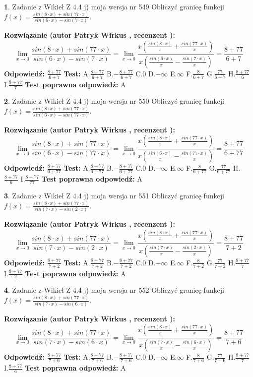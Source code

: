 \documentclass[12pt, a4paper]{article}
\theoremstyle{definition} %
\newtheorem{zad}{}
\newcommand{\zadStart}[1]{\begin{zad}#1\newline}
\newcommand{\zadStop}{\end{zad}}
\newcommand{\rozwStart}[2]{\noindent \textbf{Rozwiązanie (autor #1 , recenzent #2): }\newline}
\newcommand{\rozwStop}{\newline}
\newcommand{\odpStart}{\noindent \textbf{Odpowiedź:}\newline}
\newcommand{\odpStop}{\newline}
\newcommand{\testStart}{\noindent \textbf{Test:}\newline}
\newcommand{\testStop}{\newline}
\newcommand{\kluczStart}{\noindent \textbf{Test poprawna odpowiedź:}\newline}
\newcommand{\kluczStop}{\newline}
\begin{document}
\zadStart{Zadanie z Wikieł Z 4.4 j) moja wersja nr 549}
Obliczyć granicę funkcji $f(x)=\frac{sin(8\cdot x) +sin(77\cdot x)}{sin(6\cdot x) -sin(7\cdot x)}$.
\zadStop
\rozwStart{Patryk Wirkus}{}
$$\lim\limits_{x\to 0}\frac{sin(8\cdot x) +sin(77\cdot x)}{sin(6\cdot x) -sin(7\cdot x)}=\lim\limits_{x\to 0}\frac{x(\frac{sin(8\cdot x)}{x}+\frac{sin(77\cdot x)}{x})}{x(\frac{sin(6\cdot x)}{x}-\frac{sin(7\cdot x)}{x})}=\frac{8+77}{6+7}$$
\rozwStop
\odpStart
$\frac{8+77}{6+7}$
\odpStop
\testStart
A.$\frac{8+77}{6+7}$
B.$-\frac{8+77}{6+7}$
C.$0$
D.$-\infty$
E.$\infty$
F.$\frac{8}{6+7}$
G.$\frac{77}{6+7}$
H.$\frac{8+77}{6}$
I.$\frac{8+77}{7}$
\testStop
\kluczStart
A
\kluczStop



\zadStart{Zadanie z Wikieł Z 4.4 j) moja wersja nr 550}
Obliczyć granicę funkcji $f(x)=\frac{sin(8\cdot x) +sin(77\cdot x)}{sin(6\cdot x) -sin(77\cdot x)}$.
\zadStop
\rozwStart{Patryk Wirkus}{}
$$\lim\limits_{x\to 0}\frac{sin(8\cdot x) +sin(77\cdot x)}{sin(6\cdot x) -sin(77\cdot x)}=\lim\limits_{x\to 0}\frac{x(\frac{sin(8\cdot x)}{x}+\frac{sin(77\cdot x)}{x})}{x(\frac{sin(6\cdot x)}{x}-\frac{sin(77\cdot x)}{x})}=\frac{8+77}{6+77}$$
\rozwStop
\odpStart
$\frac{8+77}{6+77}$
\odpStop
\testStart
A.$\frac{8+77}{6+77}$
B.$-\frac{8+77}{6+77}$
C.$0$
D.$-\infty$
E.$\infty$
F.$\frac{8}{6+77}$
G.$\frac{77}{6+77}$
H.$\frac{8+77}{6}$
I.$\frac{8+77}{77}$
\testStop
\kluczStart
A
\kluczStop



\zadStart{Zadanie z Wikieł Z 4.4 j) moja wersja nr 551}
Obliczyć granicę funkcji $f(x)=\frac{sin(8\cdot x) +sin(77\cdot x)}{sin(7\cdot x) -sin(2\cdot x)}$.
\zadStop
\rozwStart{Patryk Wirkus}{}
$$\lim\limits_{x\to 0}\frac{sin(8\cdot x) +sin(77\cdot x)}{sin(7\cdot x) -sin(2\cdot x)}=\lim\limits_{x\to 0}\frac{x(\frac{sin(8\cdot x)}{x}+\frac{sin(77\cdot x)}{x})}{x(\frac{sin(7\cdot x)}{x}-\frac{sin(2\cdot x)}{x})}=\frac{8+77}{7+2}$$
\rozwStop
\odpStart
$\frac{8+77}{7+2}$
\odpStop
\testStart
A.$\frac{8+77}{7+2}$
B.$-\frac{8+77}{7+2}$
C.$0$
D.$-\infty$
E.$\infty$
F.$\frac{8}{7+2}$
G.$\frac{77}{7+2}$
H.$\frac{8+77}{7}$
I.$\frac{8+77}{2}$
\testStop
\kluczStart
A
\kluczStop



\zadStart{Zadanie z Wikieł Z 4.4 j) moja wersja nr 552}
Obliczyć granicę funkcji $f(x)=\frac{sin(8\cdot x) +sin(77\cdot x)}{sin(7\cdot x) -sin(6\cdot x)}$.
\zadStop
\rozwStart{Patryk Wirkus}{}
$$\lim\limits_{x\to 0}\frac{sin(8\cdot x) +sin(77\cdot x)}{sin(7\cdot x) -sin(6\cdot x)}=\lim\limits_{x\to 0}\frac{x(\frac{sin(8\cdot x)}{x}+\frac{sin(77\cdot x)}{x})}{x(\frac{sin(7\cdot x)}{x}-\frac{sin(6\cdot x)}{x})}=\frac{8+77}{7+6}$$
\rozwStop
\odpStart
$\frac{8+77}{7+6}$
\odpStop
\testStart
A.$\frac{8+77}{7+6}$
B.$-\frac{8+77}{7+6}$
C.$0$
D.$-\infty$
E.$\infty$
F.$\frac{8}{7+6}$
G.$\frac{77}{7+6}$
H.$\frac{8+77}{7}$
I.$\frac{8+77}{6}$
\testStop
\kluczStart
A
\kluczStop
\end{document}
